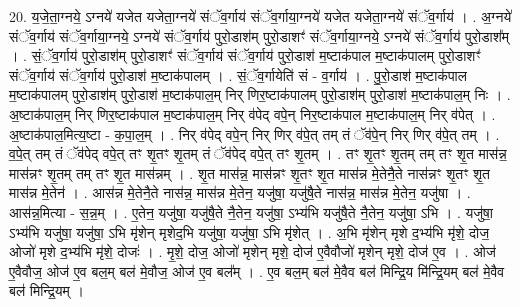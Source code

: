 \documentclass[17pt]{extarticle}
\begin{document}
20. य॒जे॒ता॒ग्नये॒ ऽग्नये॑ यजेत यजेता॒ग्नये॑ संॅव॒र्गाय॑ संॅव॒र्गाया॒ग्नये॑ यजेत यजेता॒ग्नये॑ संॅव॒र्गाय॑ । . अ॒ग्नये॑ संॅव॒र्गाय॑ संॅव॒र्गाया॒ग्नये॒ ऽग्नये॑ संॅव॒र्गाय॑ पुरो॒डाश॑म् पुरो॒डाशꣳ॑ संॅव॒र्गाया॒ग्नये॒ ऽग्नये॑ संॅव॒र्गाय॑ पुरो॒डाश᳚म् । . सं॒ॅव॒र्गाय॑ पुरो॒डाश॑म् पुरो॒डाशꣳ॑ संॅव॒र्गाय॑ संॅव॒र्गाय॑ पुरो॒डाश॑ म॒ष्टाक॑पाल म॒ष्टाक॑पालम् पुरो॒डाशꣳ॑ संॅव॒र्गाय॑ संॅव॒र्गाय॑ पुरो॒डाश॑ म॒ष्टाक॑पालम् । . सं॒ॅव॒र्गायेति॑ सं - व॒र्गाय॑ । . पु॒रो॒डाश॑ म॒ष्टाक॑पाल म॒ष्टाक॑पालम् पुरो॒डाश॑म् पुरो॒डाश॑ म॒ष्टाक॑पाल॒म् निर् णिर॒ष्टाक॑पालम् पुरो॒डाश॑म् पुरो॒डाश॑ म॒ष्टाक॑पाल॒म् निः । . अ॒ष्टाक॑पाल॒म् निर् णिर॒ष्टाक॑पाल म॒ष्टाक॑पाल॒म् निर् व॑पेद् वपे॒न् निर॒ष्टाक॑पाल म॒ष्टाक॑पाल॒म् निर् व॑पेत् । . अ॒ष्टाक॑पाल॒मित्य॒ष्टा - क॒पा॒ल॒म् । . निर् व॑पेद् वपे॒न् निर् णिर् व॑पे॒त् तम् तं ॅव॑पे॒न् निर् णिर् व॑पे॒त् तम् । . व॒पे॒त् तम् तं ॅव॑पेद् वपे॒त् तꣳ शृ॒तꣳ शृ॒तम् तं ॅव॑पेद् वपे॒त् तꣳ शृ॒तम् । . तꣳ शृ॒तꣳ शृ॒तम् तम् तꣳ शृ॒त मास॑न्न॒ मास॑न्नꣳ शृ॒तम् तम् तꣳ शृ॒त मास॑न्नम् । . शृ॒त मास॑न्न॒ मास॑न्नꣳ शृ॒तꣳ शृ॒त मास॑न्न मे॒तेनै॒ते नास॑न्नꣳ शृ॒तꣳ शृ॒त मास॑न्न मे॒तेन॑ । . आस॑न्न मे॒तेनै॒ते नास॑न्न॒ मास॑न्न मे॒तेन॒ यजु॑षा॒ यजु॑षै॒ते नास॑न्न॒ मास॑न्न मे॒तेन॒ यजु॑षा । . आस॑न्न॒मित्या - स॒न्न॒म् । . ए॒तेन॒ यजु॑षा॒ यजु॑षै॒ते नै॒तेन॒ यजु॑षा॒ ऽभ्य॑भि यजु॑षै॒ते नै॒तेन॒ यजु॑षा॒ ऽभि । . यजु॑षा॒ ऽभ्य॑भि यजु॑षा॒ यजु॑षा॒ ऽभि मृ॑शेन् मृशेद॒भि यजु॑षा॒ यजु॑षा॒ ऽभि मृ॑शेत् । . अ॒भि मृ॑शेन् मृशे द॒भ्य॑भि मृ॑शे॒ दोज॒ ओजो॑ मृशे द॒भ्य॑भि मृ॑शे॒ दोजः॑ । . मृ॒शे॒ दोज॒ ओजो॑ मृशेन् मृशे॒ दोज॑ ए॒वैवौजो॑ मृशेन् मृशे॒ दोज॑ ए॒व । . ओज॑ ए॒वैवौज॒ ओज॑ ए॒व बल॒म् बल॑ मे॒वौज॒ ओज॑ ए॒व बल᳚म् । . ए॒व बल॒म् बल॑ मे॒वैव बल॑ मिन्द्रि॒य मि॑न्द्रि॒यम् बल॑ मे॒वैव बल॑ मिन्द्रि॒यम् । \newline
\end{document}
